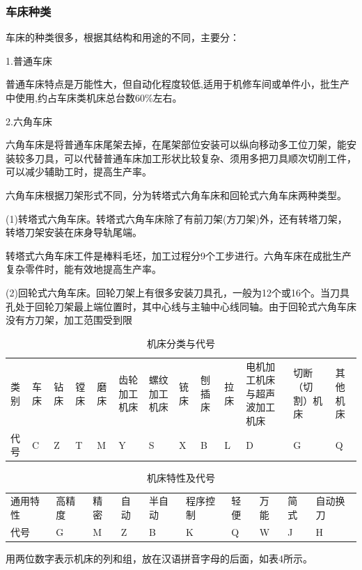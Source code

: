 \documentclass{ctexbook}
\begin{document}
\subsubsection{车床种类}
车床的种类很多，根据其结构和用途的不同，主要分：

1.普通车床

普通车床特点是万能性大，但自动化程度较低,适用于机修车间或单件小，批生产中使用,约占车床类机床总台数60\%左右。

2.六角车床

六角车床是将普通车床尾架去掉，在尾架部位安装可以纵向移动多工位刀架，能安装较多刀具，可以代替普通车床加工形状比较复杂、须用多把刀具顺次切削工件，可以减少辅助工时，提高生产率。

六角车床根据刀架形式不同，分为转塔式六角车床和回轮式六角车床两种类型。

(1)转塔式六角车床。转塔式六角车床除了有前刀架(方刀架)外，还有转塔刀架，转塔刀架安装在床身导轨尾端。

转塔式六角车床工件是棒料毛坯，加工过程分9个工步进行。六角车床在成批生产复杂零件时，能有效地提高生产率。

(2)回轮式六角车床。回轮刀架上有很多安装刀具孔，一般为12个或16个。当刀具孔处于回轮刀架最上端位置时，其中心线与主轴中心线同轴。由于回轮式六角车床没有方刀架，加工范围受到限

\begin{table}[htbp]
	\centering
	\caption{机床分类与代号}
	\begin{tabular}{lllllllllllll}
		类别    & 车床    & 钻床    & 镗床    & 磨床    & 齿轮加工机床 & 螺纹加工机床 & 铳床    & 刨插床   & 拉床    & 电机加工机床与超声波加工机床 & 切断（切割）机床 & 其他机床 \\
		代号    & C     & Z     & T     & M     & Y     & S     & X     & B     & L     & D     & G     & Q \\
	\end{tabular}%
	\label{tab:jichuang}%
\end{table}%


\begin{table}[htbp]
	\centering
	\caption{机床特性及代号}
	\begin{tabular}{llllllllll}
		通用特性  & 高精度   & 精密    & 自动    & 半自动   & 程序控制  & 轻便    & 万能    & 简式    & 自动换刀 \\
		代号    & G     & M     & Z     & B     & K     & Q     & W     & J     & H  \\
	\end{tabular}%
	\label{tab:jichuangtexing}%
\end{table}%
用两位数字表示机床的列和组，放在汉语拼音字母的后面，如表4所示。
\end{document}
